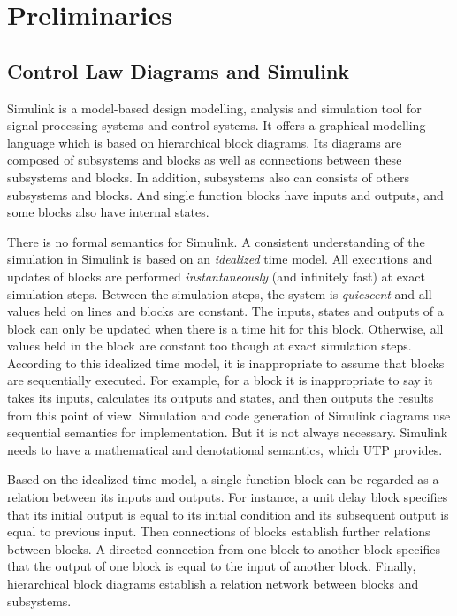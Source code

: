 \section{Preliminaries}\label{sec:prel}
\subsection{Control Law Diagrams and Simulink} \label{ssec:simulink}
Simulink is a model-based design modelling, analysis and simulation tool for signal processing systems and control systems. It offers a graphical modelling language which is based on hierarchical block diagrams. Its diagrams are composed of subsystems and blocks as well as connections between these subsystems and blocks. In addition, subsystems also can consists of others subsystems and blocks. And single function blocks have inputs and outputs, and some blocks also have internal states.

There is no formal semantics for Simulink. A consistent understanding \cite{Marian2007, Cavalcanti2013} of the simulation in Simulink is based on an \emph{idealized} time model. All executions and updates of blocks are performed \emph{instantaneously} (and infinitely fast) at exact simulation steps. Between the simulation steps, the system is \emph{quiescent} and all values held on lines and blocks are constant. The inputs, states and outputs of a block can only be updated when there is a time hit for this block. Otherwise, all values held in the block are constant too though at exact simulation steps. According to this idealized time model, it is inappropriate to assume that blocks are sequentially executed. For example, for a block it is inappropriate to say it takes its inputs, calculates its outputs and states, and then outputs the results from this point of view. Simulation and code generation of Simulink diagrams use sequential semantics for implementation. But it is not always necessary. 
Simulink needs to have a mathematical and denotational semantics, which UTP provides.

Based on the idealized time model, a single function block can be regarded as a relation between its inputs and outputs. For instance, a unit delay block specifies that its initial output is equal to its initial condition and its subsequent output is equal to previous input. Then connections of blocks establish further relations between blocks. A directed connection from one block to another block specifies that the output of one block is equal to the input of another block. Finally, hierarchical block diagrams establish a relation network between blocks and subsystems. 

